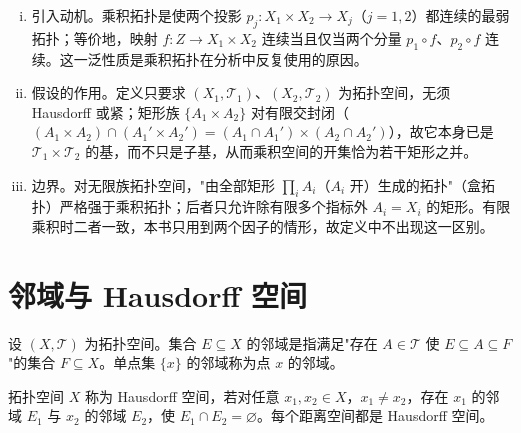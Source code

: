 \documentclass[../main.tex]{subfiles}
\begin{document}
\begin{remark}\label{remark:appA-乘积拓扑}
\begin{enumerate}[(i)]
\item 引入动机。乘积拓扑是使两个投影 $p_j:X_1\times X_2\to X_j$（$j=1,2$）都连续的最弱拓扑；等价地，映射 $f:Z\to X_1\times X_2$ 连续当且仅当两个分量 $p_1\circ f$、$p_2\circ f$ 连续。这一泛性质是乘积拓扑在分析中反复使用的原因。
\item 假设的作用。定义只要求 $(X_1,\mathscr{T}_1)$、$(X_2,\mathscr{T}_2)$ 为拓扑空间，无须 Hausdorff 或紧；矩形族 $\{A_1\times A_2\}$ 对有限交封闭（$(A_1\times A_2)\cap(A_1'\times A_2')=(A_1\cap A_1')\times(A_2\cap A_2')$），故它本身已是 $\mathscr{T}_1\times\mathscr{T}_2$ 的基，而不只是子基，从而乘积空间的开集恰为若干矩形之并。
\item 边界。对无限族拓扑空间，"由全部矩形 $\prod_iA_i$（$A_i$ 开）生成的拓扑"（盒拓扑）严格强于乘积拓扑；后者只允许除有限多个指标外 $A_i=X_i$ 的矩形。有限乘积时二者一致，本书只用到两个因子的情形，故定义中不出现这一区别。
\end{enumerate}
\end{remark}

\section{邻域与 Hausdorff 空间}\label{section:appA-邻域Hausdorff}

\begin{definition}[邻域]\label{definition:appA-邻域}
设 $(X,\mathscr{T})$ 为拓扑空间。集合 $E\subseteq X$ 的邻域是指满足"存在 $A\in\mathscr{T}$ 使 $E\subseteq A\subseteq F$"的集合 $F\subseteq X$。单点集 $\{x\}$ 的邻域称为点 $x$ 的邻域。
\end{definition}

\begin{definition}[Hausdorff 空间]\label{definition:appA-Hausdorff}
拓扑空间 $X$ 称为 Hausdorff 空间，若对任意 $x_1,x_2\in X$，$x_1\neq x_2$，存在 $x_1$ 的邻域 $E_1$ 与 $x_2$ 的邻域 $E_2$，使 $E_1\cap E_2=\varnothing$。每个距离空间都是 Hausdorff 空间。
\end{definition}
\end{document}

